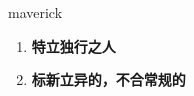
\begin{frame}
{\huge maverick}
\begin{center}
\begin{enumerate}\Large
  \item \textbf{特立独行之人}
  \item \textbf{标新立异的，不合常规的}
\end{enumerate}
\end{center}
\end{frame}
